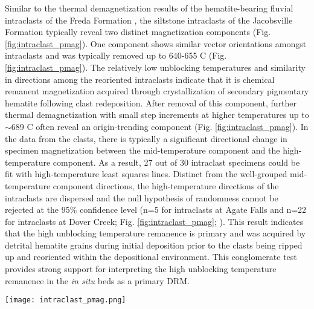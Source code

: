 Similar to the thermal demagnetization results of the hematite-bearing fluvial intraclasts of the Freda Formation \cite{Swanson-Hysell2019b}, the siltstone intraclasts of the Jacobsville Formation typically reveal two distinct magnetization components (Fig. \ref{fig:intraclast_pmag}). One component shows similar vector orientations amongst intraclasts and was typically removed up to 640-655 \textdegree C (Fig. \ref{fig:intraclast_pmag}). The relatively low unblocking temperatures and similarity in directions among the reoriented intraclasts indicate that it is chemical remanent magnetization acquired through crystallization of secondary pigmentary hematite following clast redeposition. After removal of this component, further thermal demagnetization with small step increments at higher temperatures up to $\sim$689 \textdegree C often reveal an origin-trending component (Fig. \ref{fig:intraclast_pmag}). In the data from the clasts, there is typically a significant directional change in specimen magnetization between the mid-temperature component and the high-temperature component. As a result, 27 out of 30 intraclast specimens could be fit with high-temperature least squares lines. Distinct from the well-grouped mid-temperature component directions, the high-temperature directions of the intraclasts are dispersed and the null hypothesis of randomness cannot be rejected at the 95\% confidence level (n=5 for intraclasts at Agate Falls and n=22 for intraclasts at Dover Creek; Fig. \ref{fig:intraclast_pmag}; ). This result indicates that the high unblocking temperature remanence is primary and was acquired by detrital hematite grains during initial deposition prior to the clasts being ripped up and reoriented within the depositional environment. This conglomerate test provides strong support for interpreting the high unblocking temperature remanence in the \textit{in situ} beds as a primary DRM. 

\begin{figure*}[h!]
\centering
\texttt{[image: intraclast\_pmag.png]}
\caption{\scriptsize(A) Field photos of siltstone to fine-grained sandstone fluvial intraclasts within conglomerate and conglomeratic sandstone beds in the Jacobsville Formation. (B) Representative step-wise thermal demagnetization data from an intraclast from Dover Creek (HFC-23) plotted on an orthogonal vector diagram. The plot reveals a mid-temperature component and an origin-trending high-temperature component. The components are present as varying fractions of the overall remanence in different specimens. The direction of the mid-temperature component (interpreted as secondary CRM) is shown as dark red arrows on the orthogonal vector plots and dark red circles on the equal area plots, while the high-temperature component (interpreted as primary DRM) is shown in grey. (C, D) The mid-temperature component has a similar direction among the clasts as can be seen on the summary equal area plots. In contrast, the high-temperature component directions are dispersed and pass the randomness test of . Both the DRM and the CRM directions are shown in geographic coordinates. NRM = natural remanent magnetization.}
\label{fig:intraclast_pmag}
\end{figure*}

